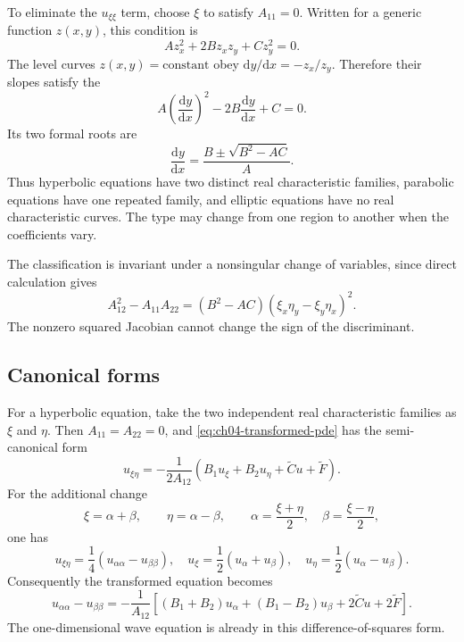 To eliminate the $u_{\xi\xi}$ term, choose $\xi$ to satisfy $A_{11}=0$. Written for a generic function $z(x,y)$, this condition is
\begin{equation}
Az_x^2+2Bz_xz_y+Cz_y^2=0.
\end{equation}
The level curves $z(x,y)=\text{constant}$ obey $\mathrm{d}y/\mathrm{d}x=-z_x/z_y$. Therefore their slopes satisfy the 
\begin{equation}
A\left(\frac{\mathrm{d}y}{\mathrm{d}x}\right)^2
-2B\frac{\mathrm{d}y}{\mathrm{d}x}+C=0.
\end{equation}
Its two formal roots are
\begin{equation}
\frac{\mathrm{d}y}{\mathrm{d}x}
=\frac{B\pm\sqrt{B^2-AC}}{A}.
\end{equation}
Thus hyperbolic equations have two distinct real characteristic families, parabolic equations have one repeated family, and elliptic equations have no real characteristic curves. The type may change from one region to another when the coefficients vary.

The classification is invariant under a nonsingular change of variables, since direct calculation gives
\begin{equation}
A_{12}^2-A_{11}A_{22}
=(B^2-AC)(\xi_x\eta_y-\xi_y\eta_x)^2.
\end{equation}
The nonzero squared Jacobian cannot change the sign of the discriminant.

\subsection{Canonical forms}

For a hyperbolic equation, take the two independent real characteristic families as $\xi$ and $\eta$. Then $A_{11}=A_{22}=0$, and \eqref{eq:ch04-transformed-pde} has the semi-canonical form
\begin{equation}
u_{\xi\eta}=-\frac{1}{2A_{12}}
\left(B_1u_\xi+B_2u_\eta+\widetilde C u+\widetilde F\right).
\end{equation}
For the additional change
\begin{equation}
\xi=\alpha+\beta,\qquad \eta=\alpha-\beta,
\qquad
\alpha=\frac{\xi+\eta}{2},\quad
\beta=\frac{\xi-\eta}{2},
\end{equation}
one has
\begin{equation}
u_{\xi\eta}=\frac14\left(u_{\alpha\alpha}-u_{\beta\beta}\right),
\quad
u_\xi=\frac12(u_\alpha+u_\beta),
\quad
u_\eta=\frac12(u_\alpha-u_\beta).
\end{equation}
Consequently the transformed equation becomes
\begin{equation}
u_{\alpha\alpha}-u_{\beta\beta}
=-\frac{1}{A_{12}}\left[(B_1+B_2)u_\alpha
+(B_1-B_2)u_\beta+2\widetilde C u+2\widetilde F\right].
\end{equation}
The one-dimensional wave equation is already in this difference-of-squares form.

